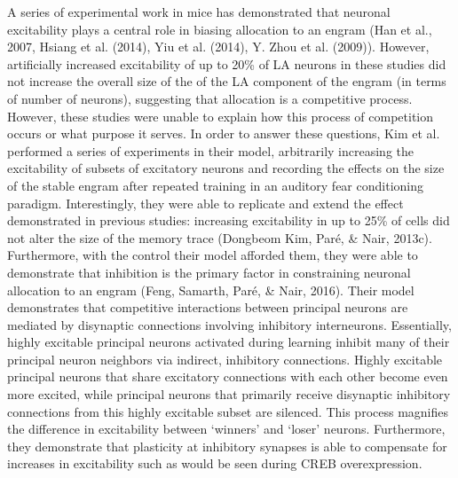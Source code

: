 \documentclass[12pt,a4paper,]{report}
\begin{document}
A series of experimental work in mice has demonstrated that neuronal
excitability plays a central role in biasing allocation to an engram
(Han et al., 2007, Hsiang et al. (2014), Yiu et al. (2014), Y. Zhou et
al. (2009)). However, artificially increased excitability of up to 20\%
of LA neurons in these studies did not increase the overall size of the
of the LA component of the engram (in terms of number of neurons),
suggesting that allocation is a competitive process. However, these
studies were unable to explain how this process of competition occurs or
what purpose it serves. In order to answer these questions, Kim et al.
performed a series of experiments in their model, arbitrarily increasing
the excitability of subsets of excitatory neurons and recording the
effects on the size of the stable engram after repeated training in an
auditory fear conditioning paradigm. Interestingly, they were able to
replicate and extend the effect demonstrated in previous studies:
increasing excitability in up to 25\% of cells did not alter the size of
the memory trace (Dongbeom Kim, Paré, \& Nair, 2013c). Furthermore, with
the control their model afforded them, they were able to demonstrate
that inhibition is the primary factor in constraining neuronal
allocation to an engram (Feng, Samarth, Paré, \& Nair, 2016). Their
model demonstrates that competitive interactions between principal
neurons are mediated by disynaptic connections involving inhibitory
interneurons. Essentially, highly excitable principal neurons activated
during learning inhibit many of their principal neuron neighbors via
indirect, inhibitory connections. Highly excitable principal neurons
that share excitatory connections with each other become even more
excited, while principal neurons that primarily receive disynaptic
inhibitory connections from this highly excitable subset are silenced.
This process magnifies the difference in excitability between `winners'
and `loser' neurons. Furthermore, they demonstrate that plasticity at
inhibitory synapses is able to compensate for increases in excitability
such as would be seen during CREB overexpression.
\end{document}
